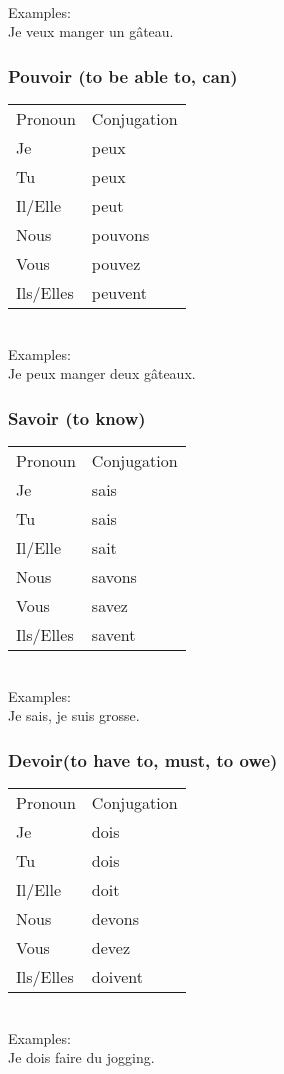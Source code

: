 \noindent \\Examples:\\
Je veux manger un g\^ateau.

\subsubsection{Pouvoir (to be able to, can)}
\begin{tabular}{| l | l |}
\hline
Pronoun 	& Conjugation	\\
Je		    & peux     \\
Tu		    & peux     \\
Il/Elle		& peut     \\
Nous		& pouvons     \\
Vous		& pouvez     \\
Ils/Elles	& peuvent     \\
\hline
\end{tabular}

\noindent \\Examples:\\
Je peux manger deux g\^ateaux.

\subsubsection{Savoir (to know)}
\begin{tabular}{| l | l |}
\hline
Pronoun 	& Conjugation	\\
Je		    &  sais \\
Tu		    &  sais \\
Il/Elle		&  sait \\
Nous		&  savons \\
Vous		&  savez  \\
Ils/Elles	&  savent \\
\hline
\end{tabular}

\noindent \\Examples:\\
Je sais, je suis grosse.

\subsubsection{Devoir(to have to, must, to owe)}
\begin{tabular}{| l | l |}
\hline
Pronoun 	& Conjugation	\\
Je		    &  dois \\
Tu		    &  dois \\
Il/Elle		&  doit \\
Nous		&  devons   \\
Vous		&  devez \\
Ils/Elles	&  doivent \\
\hline
\end{tabular}

\noindent \\Examples:\\
Je dois faire du jogging.
